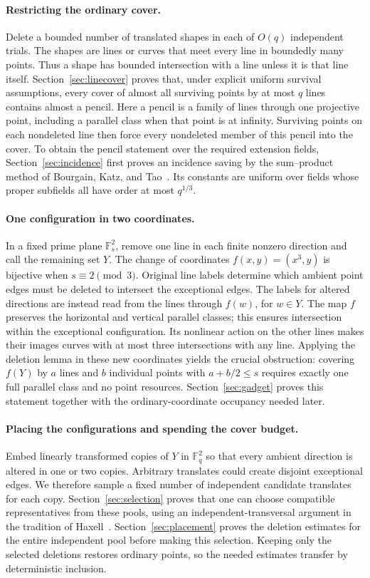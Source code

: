 \documentclass[11pt]{article}
\theoremstyle{remark}
\newcommand{\F}{\mathbb F}
\begin{document}
\paragraph{Restricting the ordinary cover.}
Delete a bounded number of translated shapes in each of $O(q)$
independent trials. The shapes are lines or curves that meet every
line in boundedly many points. Thus a shape has bounded intersection
with a line unless it is that line itself. Section~\ref{sec:linecover} proves that, under explicit
uniform survival assumptions, every cover of almost all surviving
points by at most $q$ lines contains almost a pencil. Here a pencil is
a family of lines through one projective point, including a parallel
class when that point is at infinity. Surviving points on each
nondeleted line then force every nondeleted member of this pencil
into the cover. To obtain the pencil statement over the required
extension fields, Section~\ref{sec:incidence} first proves an incidence
saving by the sum--product method of Bourgain, Katz, and
Tao~\cite{BKT2004}. Its constants are uniform over fields whose proper
subfields all have order at most $q^{1/3}$.

\paragraph{One configuration in two coordinates.}
In a fixed prime plane $\F_s^2$, remove one line in each finite nonzero
direction and call the remaining set $Y$. The change of coordinates
$f(x,y)=(x^3,y)$ is bijective when $s\equiv2\pmod3$. Original line
labels determine which ambient point edges must be deleted to
intersect the exceptional edges. The labels for altered directions
are instead read from the lines through $f(w)$, for $w\in Y$.
The map $f$ preserves the horizontal and vertical parallel classes;
this ensures intersection within the exceptional configuration.
Its nonlinear action on the other lines makes their images curves
with at most three intersections with any line. Applying the deletion
lemma in these new coordinates yields the crucial obstruction:
covering $f(Y)$ by $a$ lines and $b$ individual points with
$a+b/2\le s$ requires exactly one full parallel class and no point
resources. Section~\ref{sec:gadget} proves this statement together
with the ordinary-coordinate occupancy needed later.

\paragraph{Placing the configurations and spending the cover budget.}
Embed linearly transformed copies of $Y$ in $\F_q^2$ so that every
ambient direction is altered in one or two copies. Arbitrary translates
could create disjoint exceptional edges. We therefore sample a fixed
number of independent candidate translates for each copy.
Section~\ref{sec:selection} proves that one can choose compatible
representatives from these pools, using an independent-transversal
argument in the tradition of Haxell~\cite{Haxell1995,Haxell2001}.
Section~\ref{sec:placement} proves the deletion estimates for the
entire independent pool before making this selection. Keeping only
the selected deletions restores ordinary points, so the needed
estimates transfer by deterministic inclusion.
\end{document}
